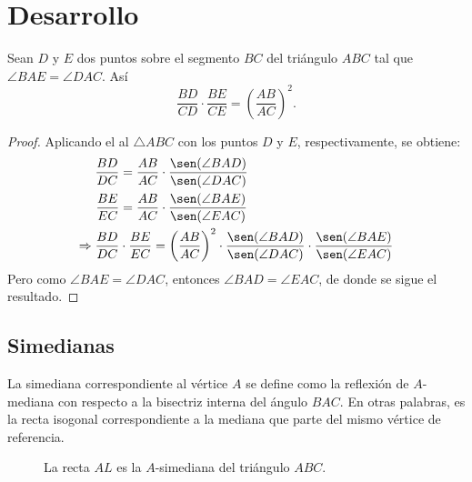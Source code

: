 \section{Desarrollo}

\begin{section-theorem.tcb}[Steiner]\label{steiner-theorem}
    Sean $D$ y $E$ dos puntos sobre el segmento $BC$ del triángulo $ABC$ tal que $\angle BAE = \angle DAC$.
    Así
    \[
        \frac{BD}{CD} \cdot \frac{BE}{CE} = \left(\frac{AB}{AC}\right)^2.
    \]
\end{section-theorem.tcb}
\begin{figure}[H]
    \centering
    
\end{figure}
\begin{proof}
    Aplicando el  al $\triangle ABC$ con los puntos $D$ y $E$, respectivamente, se obtiene:
    \begin{align*}
        \frac{BD}{DC} &= \frac{AB}{AC} \cdot \frac{\sen(\angle BAD)}{\sen(\angle DAC)}\\
        \frac{BE}{EC} &= \frac{AB}{AC} \cdot \frac{\sen(\angle BAE)}{\sen(\angle EAC)}\\
        \Rightarrow \frac{BD}{DC} &\cdot \frac{BE}{EC} = \left(\frac{AB}{AC}\right)^2 \cdot \frac{\sen(\angle BAD)}{\sen(\angle DAC)} \cdot \frac{\sen(\angle BAE)}{\sen(\angle EAC)}\\
    \end{align*}
    Pero como $\angle BAE = \angle DAC$, entonces $\angle BAD = \angle EAC$, de donde se sigue el resultado.
\end{proof}



\subsection{Simedianas}


\begin{section-definition.tcb}[Simediana]
    La simediana correspondiente al vértice $A$ se define como la reflexión de $A$\nobreakdash-mediana con respecto a la bisectriz interna del ángulo $BAC$.
    En otras palabras, es la recta isogonal correspondiente a la mediana que parte del mismo vértice de referencia.
\end{section-definition.tcb}
\begin{figure}[H]
    \centering
    
    \caption{La recta $AL$ es la $A$-simediana del triángulo $ABC$.}
    \label{fig:symmedian-definition}
\end{figure}

